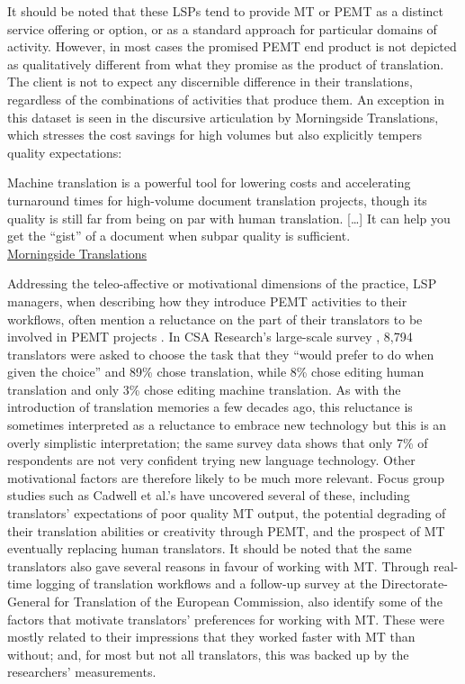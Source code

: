 \documentclass[output=paper,colorlinks,citecolor=brown]{langsci/langscibook}
\begin{document}
It should be noted that these LSPs tend to provide MT or PEMT as a distinct service offering or option, or as a standard approach for particular domains of activity. However, in most cases the promised PEMT end product is not depicted as qualitatively different from what they promise as the product of translation. The client is not to expect any discernible difference in their translations, regardless of the combinations of activities that produce them. An exception in this dataset is seen in the discursive articulation by Morningside Translations, which stresses the cost savings for high volumes but also explicitly tempers quality expectations:

\begin{modquote}
Machine translation is a powerful tool for lowering costs and accelerating turnaround times for high-volume document translation projects, though its quality is still far from being on par with human translation. […] It can help you get the \enquote{gist} of a document when subpar quality is sufficient. \\
\href{https://www.morningtrans.com/services/translations/document-translations/}{Morningside Translations}
\end{modquote}


Addressing the teleo-affective or motivational dimensions of the practice, LSP managers, when describing how they introduce PEMT activities to their workflows, often mention a reluctance on the part of their translators to be involved in PEMT projects \citep[e.g.,][]{premoli_mtpe_2019,kosmaczewska_application_2019}. In CSA Research’s large-scale survey \citep{pielmeier_state_2020}, 8,794 translators were asked to choose the task that they \enquote{would prefer to do when given the choice} and 89\% chose translation, while 8\% chose editing human translation and only 3\% chose editing machine translation. As with the introduction of translation memories a few decades ago, this reluctance is sometimes interpreted as a reluctance to embrace new technology but this is an overly simplistic interpretation; the same survey data shows that only 7\% of respondents are not very confident trying new language technology. Other motivational factors are therefore likely to be much more relevant. Focus group studies such as Cadwell et al.’s \citeyearpar{cadwell_resistance_2018} have uncovered several of these, including translators’ expectations of poor quality MT output, the potential degrading of their translation abilities or creativity through PEMT, and the prospect of MT eventually replacing human translators. It should be noted that the same translators also gave several reasons in favour of working with MT. Through real-time logging of translation workflows and a follow-up survey at the Directorate-General for Translation of the European Commission, \citet{macken_quantifying_2020} also identify some of the factors that motivate translators’ preferences for working with MT. These were mostly related to their impressions that they worked faster with MT than without; and, for most but not all translators, this was backed up by the researchers’ measurements. 
\end{document}
